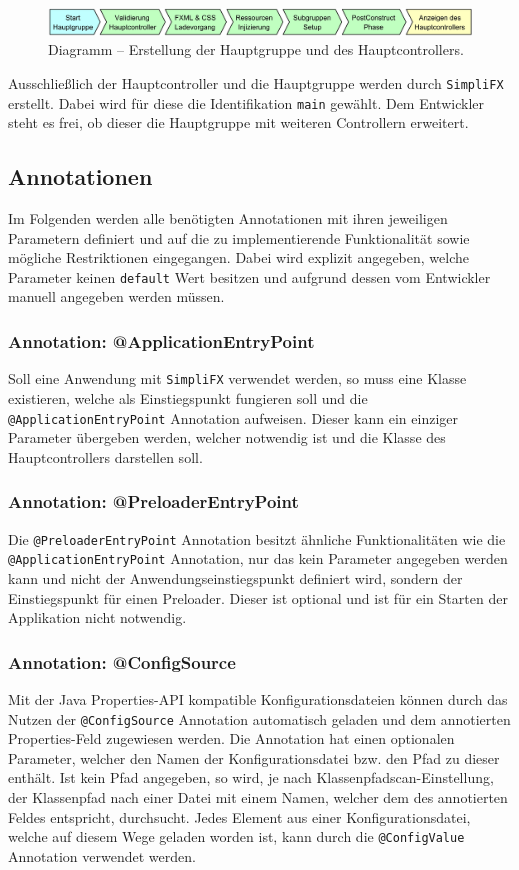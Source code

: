 \begin{figure}[H]
	\centering
	\includegraphics[width=\textwidth]{Abbildungen/Controller Erstellungsprozess.png}
	\caption{Diagramm -- Erstellung der Hauptgruppe und des Hauptcontrollers.}
	\label{fig:controller_init}
\end{figure}
\noindent Ausschließlich der Hauptcontroller und die Hauptgruppe werden durch \texttt{SimpliFX} erstellt. Dabei wird für diese die Identifikation \texttt{main} gewählt. Dem Entwickler steht es frei, ob dieser die Hauptgruppe mit weiteren Controllern erweitert.
\subsection{Annotationen}
\label{annotations}
Im Folgenden werden alle benötigten Annotationen mit ihren jeweiligen Parametern definiert und auf die zu implementierende Funktionalität sowie mögliche Restriktionen eingegangen. Dabei wird explizit angegeben, welche Parameter keinen \texttt{default} Wert besitzen und aufgrund dessen vom Entwickler manuell angegeben werden müssen.
\subsubsection{Annotation: @ApplicationEntryPoint}
Soll eine Anwendung mit \texttt{SimpliFX} verwendet werden, so muss eine Klasse existieren, welche als Einstiegspunkt fungieren soll und die \texttt{@ApplicationEntryPoint} Annotation aufweisen. Dieser kann ein einziger Parameter übergeben werden, welcher notwendig ist und die Klasse des Hauptcontrollers darstellen soll.
\subsubsection{Annotation: @PreloaderEntryPoint}
Die \texttt{@PreloaderEntryPoint} Annotation besitzt ähnliche Funktionalitäten wie die \texttt{@ApplicationEntryPoint} Annotation, nur das kein Parameter angegeben werden kann und nicht der Anwendungseinstiegspunkt definiert wird, sondern der Einstiegspunkt für einen Preloader. Dieser ist optional und ist für ein Starten der Applikation nicht notwendig.
\subsubsection{Annotation: @ConfigSource}
Mit der Java Properties-API kompatible Konfigurationsdateien können durch das Nutzen der \texttt{@ConfigSource} Annotation automatisch geladen und dem annotierten Properties-Feld zugewiesen werden. Die Annotation hat einen optionalen Parameter, welcher den Namen der Konfigurationsdatei bzw. den Pfad zu dieser enthält. Ist kein Pfad angegeben, so wird, je nach Klassenpfadscan-Einstellung, der Klassenpfad nach einer Datei mit einem Namen, welcher dem des annotierten Feldes entspricht, durchsucht. Jedes Element aus einer Konfigurationsdatei, welche auf diesem Wege geladen worden ist, kann durch die \texttt{@ConfigValue} Annotation verwendet werden.

